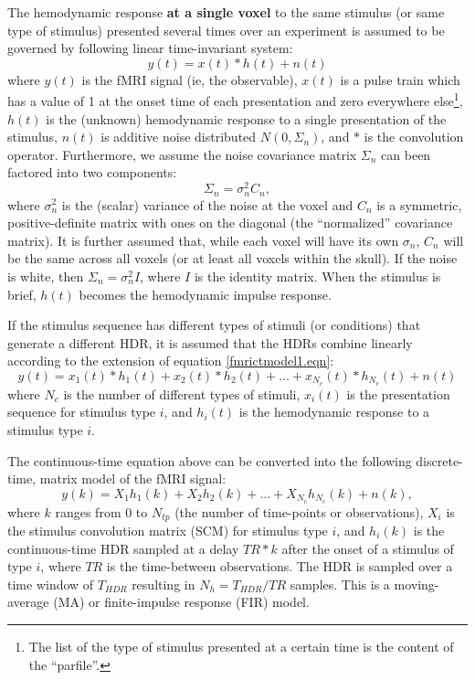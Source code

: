 \documentclass[12pt]{article}
\begin{document}
The hemodynamic response {\bf at a single voxel} to the same stimulus
(or same type of stimulus) presented several times over an experiment
is assumed to be governed by following linear time-invariant system:
\begin{equation}
y(t) = x(t)*h(t) + n(t)
\label{fmrictmodel1.eqn}
\end{equation}
where $y(t)$ is the fMRI signal (ie, the observable), $x(t)$ is a
pulse train which has a value of 1 at the onset time of each
presentation and zero everywhere else\footnote{The list of the type of
stimulus presented at a certain time is the content of the
``parfile''.}, $h(t)$ is the (unknown) hemodynamic response to a
single presentation of the stimulus, $n(t)$ is additive noise
distributed $N(0,\Sigma_n)$, and $*$ is the convolution operator.
Furthermore, we assume the noise covariance matrix $\Sigma_n$ can been
factored into two components:
\begin{equation}
\Sigma_n = \sigma_n^2 C_n,
\end{equation}
where $\sigma_n^2$ is the (scalar) variance of the noise at the voxel
and $C_n$ is a symmetric, positive-definite matrix with ones on the
diagonal (the ``normalized'' covariance matrix).  It is further
assumed that, while each voxel will have its own $\sigma_n$, $C_n$
will be the same across all voxels (or at least all voxels within the
skull).  If the noise is white, then $\Sigma_n = \sigma_n^2 I$, where
$I$ is the identity matrix. When the stimulus is brief, $h(t)$ becomes
the hemodynamic impulse response.

If the stimulus sequence has different types of stimuli (or
conditions) that generate a different HDR, it is assumed that
the HDRs combine linearly according to the extension of equation
\ref{fmrictmodel1.eqn}:
\begin{equation}
y(t) = x_1(t)*h_1(t) + x_2(t)*h_2(t) + \ldots + x_{N_c}(t)*h_{N_c}(t)
+ n(t)
\label{fmrictmodel.eqn}
\end{equation}
where $N_c$ is the number of different types of stimuli,
$x_i(t)$ is the presentation sequence for stimulus type $i$, and
$h_i(t)$ is the hemodynamic response to a stimulus type $i$.

The continuous-time equation above can be converted into 
the following discrete-time, matrix model of the fMRI signal:
\begin{equation}
y(k) = X_1 h_1(k) + X_2 h_2(k) + \ldots + X_{N_c} h_{N_c}(k) + n(k),
\label{fMRIModel.eqn}
\end{equation}
where $k$ ranges from 0 to $N_{tp}$ (the number of time-points or
observations), $X_i$ is the stimulus convolution matrix (SCM) for
stimulus type $i$, and $h_i(k)$ is the continuous-time HDR sampled at
a delay $TR*k$ after the onset of a stimulus of type $i$, where $TR$
is the time-between observations.  The HDR is sampled over a time window
of $T_{HDR}$ resulting in $N_h = T_{HDR}/ TR$ samples.  This is a
moving-average (MA) or finite-impulse response (FIR) model.
\end{document}
